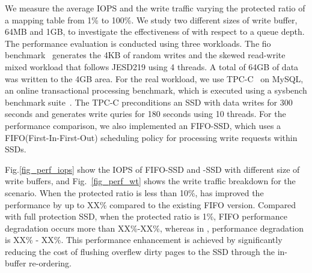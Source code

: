 We measure the average IOPS and the write traffic varying the protected ratio
of a mapping table from 1\% to 100\%. We study two different sizes of write
buffer, 64MB and 1GB, to investigate the effectiveness of \ours{} with respect
to a queue depth. The performance evaluation is conducted using three workloads.
The fio benchmark~\cite{fio-bench} generates the 4KB of random writes and the
skewed read-write mixed workload that follows JESD219 using 4 threads. A
total of 64GB of data was written to the 4GB area. For the real workload, we use 
TPC-C~\cite{council1990tpc} on MySQL, an online transactional processing benchmark, 
which is executed using a sysbench benchmark suite~\cite{sysbench}.
The TPC-C preconditions an SSD with data writes for 300 seconds and generates  
write quries for 180 seconds using 10 threads.
For the performance comparison, we also implemented an FIFO-SSD, which uses 
a FIFO(First-In-First-Out) scheduling policy for processing write requests within SSDs. 

Fig.\ref{fig_perf_iops} show the IOPS of FIFO-SSD and \ours{}-SSD with different size of write buffers, and Fig.~\ref{fig_perf_wt} shows the write traffic breakdown for the scenario.
When the protected ratio is less than 10\%, \ours{} has improved the performance by up to XX\% compared to the existing FIFO version.
Compared with full protection SSD, when the protected ratio is 1\%, FIFO performance degradation occurs more than XX\%-XX\%, whereas in \ours{}, performance degradation is XX\% - XX\%. This performance enhancement is achieved by significantly reducing the cost of flushing overflew dirty pages to the SSD through the in-buffer re-ordering.

